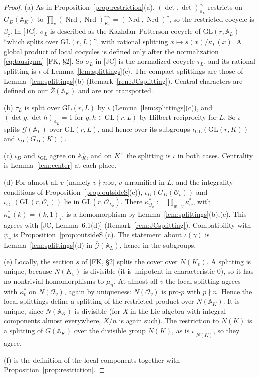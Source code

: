 \documentclass[12pt]{article}
\newcommand{\ov}[1]{\overline{#1}}
\newcommand{\A}{\mathbb{A}}
\newcommand{\cO}{\mathcal{O}}
\newcommand{\Nrd}{\operatorname{Nrd}}
\newcommand{\GL}{\mathrm{GL}}
\newcommand{\Gb}{\ov{G}}
\newcommand{\Zb}{\ov{Z}}
\newcommand{\ks}{\kappa^{*}}
\newcommand{\cG}{\mathcal{G}}
\newcommand{\cGb}{\ov{\mathcal{G}}}
\newcommand{\iD}{\iota_D}
\newcommand{\iG}{\iota_{\GL}}
\theoremstyle{plain}
\theoremstyle{definition}
\begin{document}
\begin{proof}
(a) As in Proposition~\ref{prop:restriction}(a), $(\det,\det)_{\A_L}^{c_v}$ restricts on $G_D(\A_K)$ to $\prod_v(\Nrd,\Nrd)_{K_v}^{rc_v}=(\Nrd,\Nrd)^c$, so the restricted cocycle is $\beta_\tau$. In [JC], $\sigma_L$ is described as the Kazhdan--Patterson cocycle of $\GL(r,\A_L)$ ``which splits over $\GL(r,L)$'', with rational splitting $x\mapsto s(x)/\kappa_L(x)$. A global product of local cocycles is defined only after the normalization \eqref{eq:tausigma} [FK, \S2]. So $\sigma_L$ in [JC] is the normalized cocycle $\tau_L$, and its rational splitting is $\iota$ of Lemma~\ref{lem:splittings}(c). The compact splittings are those of Lemma~\ref{lem:splittings}(b) (Remark~\ref{rem:JCsplitting}). Central characters are defined on our $\Zb(\A_K)$ and are not transported.

(b) $\tau_L$ is split over $\GL(r,L)$ by $\iota$ (Lemma~\ref{lem:splittings}(c)), and $(\det g,\det h)_{\A_L}=1$ for $g,h\in\GL(r,L)$ by Hilbert reciprocity for $L$. So $\iota$ splits $\cGb(\A_L)$ over $\GL(r,L)$, and hence over its subgroups $\iG(\GL(r,K))$ and $\iD(G_D(K))$.

(c) $\iD$ and $\iG$ agree on $\A_K^\times$, and on $K^\times$ the splitting is $\iota$ in both cases. Centrality is Lemma~\ref{lem:center} at each place.

(d) For almost all $v$ (namely $v\nmid n\infty$, $v$ unramified in $L$, and the integrality conditions of Proposition~\ref{prop:outsideS}(c)), $\iD(G_D(\cO_v))$ and $\iG(\GL(r,\cO_v))$ lie in $\GL(r,\cO_{L_v})$. There $\ks_{\cG_v}:=\prod_{w\mid v}\ks_w$, with $\ks_w(k)=(k,1)_\tau$, is a homomorphism by Lemma~\ref{lem:splittings}(b),(e). This agrees with [JC, Lemma~6.1(d)] (Remark~\ref{rem:JCsplitting}). Compatibility with $\psi_v$ is Proposition~\ref{prop:outsideS}(c). The statement about $\iota(\gamma)$ is Lemma~\ref{lem:splittings}(d) in $\cGb(\A_L)$, hence in the subgroups.

(e) Locally, the section $s$ of [FK, \S2] splits the cover over $N(K_v)$. A splitting is unique, because $N(K_v)$ is divisible (it is unipotent in characteristic $0$), so it has no nontrivial homomorphisms to $\mu_n$. At almost all $v$ the local splitting agrees with $\ks_v$ on $N(\cO_v)$, again by uniqueness: $N(\cO_v)$ is pro-$p$ with $p\nmid n$. Hence the local splittings define a splitting of the restricted product over $N(\A_K)$. It is unique, since $N(\A_K)$ is divisible (for $X$ in the Lie algebra with integral components almost everywhere, $X/n$ is again such). The restriction to $N(K)$ is a splitting of $\Gb(\A_K)$ over the divisible group $N(K)$, as is $\iota|_{N(K)}$, so they agree.

(f) is the definition of the local components together with Proposition~\ref{prop:restriction}.
\end{proof}
\end{document}
